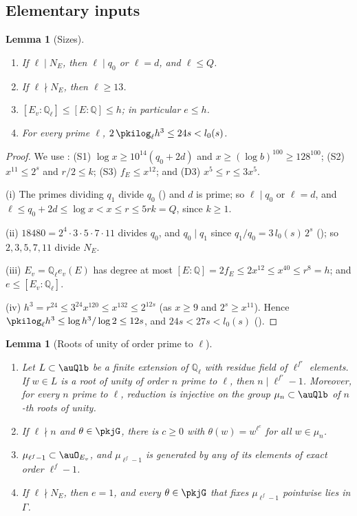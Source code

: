 \documentclass[10pt]{amsart}
\newtheorem{lemma}[theorem]{Lemma}
\theoremstyle{definition}
\theoremstyle{remark}
\newcommand{\Q}{\mathbb Q}
\begin{document}
\subsection{Elementary inputs}\label{pkj:ss-inputs}

\begin{lemma}[Sizes]\label{pkj:sizes}
\begin{enumerate}
\item[(i)] If $\ell\mid N_E$, then $\ell\mid q_0$ or $\ell=d$, and $\ell\le Q$.
\item[(ii)] If $\ell\nmid N_E$, then $\ell\ge13$.
\item[(iii)] $[E_v:\Q_\ell]\le[E:\Q]\le h$; in particular $e\le h$.
\item[(iv)] For every prime $\ell$, $2\,\pkilog_\ell h^3\le24s<l_0(s)$.
\end{enumerate}
\end{lemma}

\begin{proof}
We use {\cite[Lemma~13.4]{P46}}: (S1) $\log x\ge10^{14}(q_0+2d)$ and $x\ge(\log b)^{100}\ge128^{100}$;
(S2) $x^{11}\le2^s$ and $r/2\le k$; (S3) $f_E\le x^{12}$; and (D3) $x^5\le r\le3x^5$.

(i) The primes dividing $q_1$ divide $q_0$ ({\cite[\S13.1]{P46}}) and $d$ is prime; so $\ell\mid q_0$
or $\ell=d$, and $\ell\le q_0+2d\le\log x<x\le r\le5rk=Q$, since $k\ge1$.

(ii) $18480=2^4\cdot3\cdot5\cdot7\cdot11$ divides $q_0$, and $q_0\mid q_1$ since $q_1/q_0=3\,l_0(s)\,2^s$ ({\cite[\S13.1]{P46}}); so $2,3,5,7,11$ divide $N_E$.

(iii) $E_v=\Q_\ell e_v(E)$ has degree at most $[E:\Q]=2f_E\le2x^{12}\le x^{40}\le r^8=h$; and
$e\le[E_v:\Q_\ell]$.

(iv) $h^3=r^{24}\le3^{24}x^{120}\le x^{132}\le2^{12s}$ (as $x\ge9$ and $2^s\ge x^{11}$). Hence
$\pkilog_\ell h^3\le\log h^3/\log2\le12s$, and $24s<27s<l_0(s)$ ({\cite[\S13.1]{P46}}).
\end{proof}

\begin{lemma}[Roots of unity of order prime to $\ell$]\label{pkj:roots}
\begin{enumerate}
\item[(i)] Let $L\subset\auQlb$ be a finite extension of $\Q_\ell$ with residue field of $\ell^{f'}$
elements. If $w\in L$ is a root of unity of order $n$ prime to $\ell$, then $n\mid\ell^{f'}-1$.
Moreover, for every $n$ prime to $\ell$, reduction is injective on the group $\mu_n\subset\auQlb$ of
$n$-th roots of unity.
\item[(ii)] If $\ell\nmid n$ and $\theta\in\pkjG$, there is $c\ge0$ with $\theta(w)=w^{\ell^c}$ for all $w\in\mu_n$.
\item[(iii)] $\mu_{\ell^f-1}\subset\auO_{E_v}$, and $\mu_{\ell^f-1}$ is generated by any of its
elements of exact order $\ell^f-1$.
\item[(iv)] If $\ell\nmid N_E$, then $e=1$, and every $\theta\in\pkjG$ that fixes $\mu_{\ell^f-1}$ pointwise
lies in $\Gamma$.
\end{enumerate}
\end{lemma}
\end{document}
